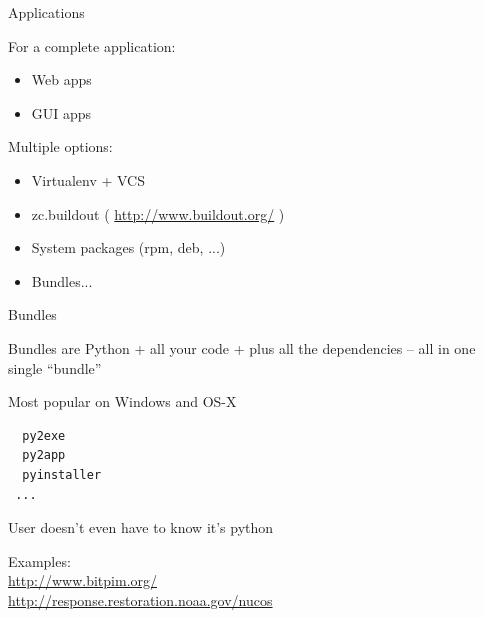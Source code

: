\documentclass{beamer}
\begin{document}
\begin{frame}[fragile]{Applications}

{\Large For a complete application:}
\begin{itemize}
  \item Web apps
  \item GUI apps
\end{itemize}

{\Large Multiple options:}
\begin{itemize}
  \item Virtualenv + VCS
  \item zc.buildout ( \url{http://www.buildout.org/} )
  \item System packages (rpm, deb, ...)
  \item Bundles...
\end{itemize}

\end{frame} 

\begin{frame}[fragile]{Bundles}

{\Large
Bundles are Python + all your code + plus all the dependencies --
all in one single ``bundle'' 

\vfill
Most popular on Windows and OS-X
}
\begin{verbatim}
  py2exe
  py2app
  pyinstaller
 ...
\end{verbatim}

{\Large User doesn't even have to know it's python }

\vfill
Examples: \\
\hspace{0.5in} \url{http://www.bitpim.org/} \\
\hspace{0.5in} \url{http://response.restoration.noaa.gov/nucos}

\end{frame} 
\end{document}
